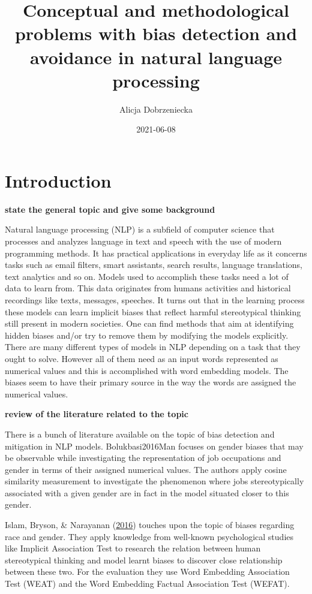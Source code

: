\documentclass[12pt,]{book}
\title{Conceptual and methodological problems with bias detection and avoidance
in natural language processing}
\author{Alicja Dobrzeniecka}
\date{2021-06-08}
\begin{document}
\maketitle

{
\setcounter{tocdepth}{5}
\tableofcontents
}
\chapter{Introduction}\label{introduction}

\textbf{state the general topic and give some background}

Natural language processing (NLP) is a subfield of computer science that
processes and analyzes language in text and speech with the use of
modern programming methods. It has practical applications in everyday
life as it concerns tasks such as email filters, smart assistants,
search results, language translations, text analytics and so on. Models
used to accomplish these tasks need a lot of data to learn from. This
data originates from humans activities and historical recordings like
texts, messages, speeches. It turns out that in the learning process
these models can learn implicit biases that reflect harmful
stereotypical thinking still present in modern societies. One can find
methods that aim at identifying hidden biases and/or try to remove them
by modifying the models explicitly. There are many different types of
models in NLP depending on a task that they ought to solve. However all
of them need as an input words represented as numerical values and this
is accomplished with word embedding models. The biases seem to have
their primary source in the way the words are assigned the numerical
values. \newline

\textbf{review of the literature related to the topic}

There is a bunch of literature available on the topic of bias detection
and mitigation in NLP models. Bolukbasi2016Man focuses on gender biases
that may be observable while investigating the representation of job
occupations and gender in terms of their assigned numerical values. The
authors apply cosine similarity measurement to investigate the
phenomenon where jobs stereotypically associated with a given gender are
in fact in the model situated closer to this gender.

Islam, Bryson, \& Narayanan
(\protect\hyperlink{ref-Caliskan2017Semantics}{2016}) touches upon the
topic of biases regarding race and gender. They apply knowledge from
well-known psychological studies like Implicit Association Test to
research the relation between human stereotypical thinking and model
learnt biases to discover close relationship between these two. For the
evaluation they use Word Embedding Association Test (WEAT) and the Word
Embedding Factual Association Test (WEFAT).
\end{document}
